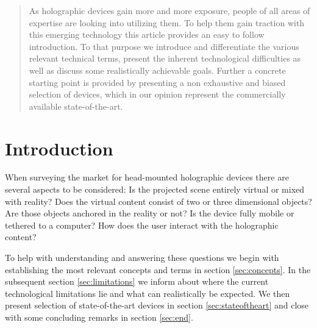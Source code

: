 \documentclass[11pt, a4paper]{IEEEtran}
\begin{document}





%
\IEEEpeerreviewmaketitle

\begin{abstract}
As holographic devices gain more and more exposure, people of all areas of expertise are looking into utilizing them. To help them gain traction with this emerging technology this article provides an easy to follow introduction. To that purpose we introduce and differentiate the various relevant technical terms, present the inherent technological difficulties as well as discuss some realistically achievable goals. Further a concrete starting point is provided by presenting a non exhaustive and biased selection of devices, which in our opinion represent the commercially available state-of-the-art.
\end{abstract}


\section{Introduction}
When surveying the market for head-mounted holographic devices there are several aspects to be considered: Is the projected scene entirely virtual or mixed with reality? Does the virtual content consist of two or three dimensional objects? Are those objects anchored in the reality or not? Is the device fully mobile or tethered to a computer? How does the user interact with the holographic content? 

To help with understanding and answering these questions we begin with establishing the most relevant concepts and terms in section \ref{sec:concepts}. In the subsequent section \ref{sec:limitations} we inform about where the current technological limitations lie and what can realistically be expected. We then present selection of state-of-the-art devices in section \ref{sec:stateoftheart} and close with some concluding remarks in section \ref{sec:end}.
\end{document}
